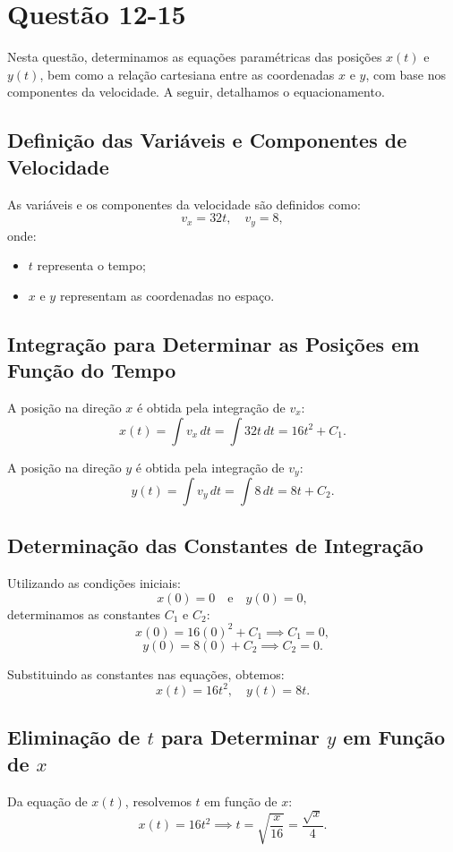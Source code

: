 \section{Questão 12-15}

Nesta questão, determinamos as equações paramétricas das posições \(x(t)\) e \(y(t)\), bem como a relação cartesiana entre as coordenadas \(x\) e \(y\), com base nos componentes da velocidade. A seguir, detalhamos o equacionamento.

\subsection*{Definição das Variáveis e Componentes de Velocidade}
As variáveis e os componentes da velocidade são definidos como:
\[
v_x = 32t, \quad v_y = 8,
\]
onde:
\begin{itemize}
    \item \(t\) representa o tempo;
    \item \(x\) e \(y\) representam as coordenadas no espaço.
\end{itemize}

\subsection*{Integração para Determinar as Posições em Função do Tempo}
A posição na direção \(x\) é obtida pela integração de \(v_x\):
\[
x(t) = \int v_x \, dt = \int 32t \, dt = 16t^2 + C_1.
\]

A posição na direção \(y\) é obtida pela integração de \(v_y\):
\[
y(t) = \int v_y \, dt = \int 8 \, dt = 8t + C_2.
\]

\subsection*{Determinação das Constantes de Integração}
Utilizando as condições iniciais:
\[
x(0) = 0 \quad \text{e} \quad y(0) = 0,
\]
determinamos as constantes \(C_1\) e \(C_2\):
\[
x(0) = 16(0)^2 + C_1 \implies C_1 = 0,
\]
\[
y(0) = 8(0) + C_2 \implies C_2 = 0.
\]

Substituindo as constantes nas equações, obtemos:
\[
x(t) = 16t^2, \quad y(t) = 8t.
\]

\subsection*{Eliminação de \(t\) para Determinar \(y\) em Função de \(x\)}
Da equação de \(x(t)\), resolvemos \(t\) em função de \(x\):
\[
x(t) = 16t^2 \implies t = \sqrt{\frac{x}{16}} = \frac{\sqrt{x}}{4}.
\]

